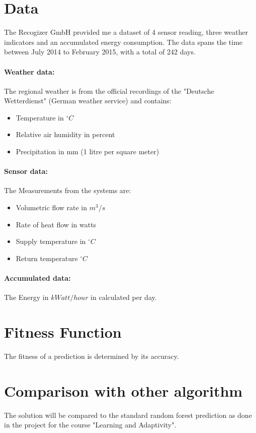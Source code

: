 \documentclass{scrartcl}
\begin{document}
\section{Data}
The Recogizer GmbH provided me a dataset of 4 sensor reading, three weather indicators and an accumulated energy consumption. The data spans the time between July 2014 to February 2015, with a total of 242 days.

\paragraph{Weather data:}
The regional weather is from the official recordings of the "Deutsche Wetterdienst" (German weather service) and contains:

\begin{itemize}
\item Temperature in $^\circ C$
\item Relative air humidity in percent
\item Precipitation in mm (1 litre per square meter)
\end{itemize}

\paragraph{Sensor data:}
The Measurements from the systems are:

\begin{itemize}
\item Volumetric flow rate in $m^3 / s$
\item Rate of heat flow in watts
\item Supply temperature in $^\circ C$
\item Return temperature $^\circ C$
\end{itemize}

\paragraph{Accumulated data:}
The Energy in $k Watt/hour$ in calculated per day.

\section{Fitness Function}
The fitness of a prediction is determined by its accuracy.

\section{Comparison with other algorithm}
The solution will be compared to the standard random forest prediction as done in the project for the course "Learning and Adaptivity".
\end{document}
